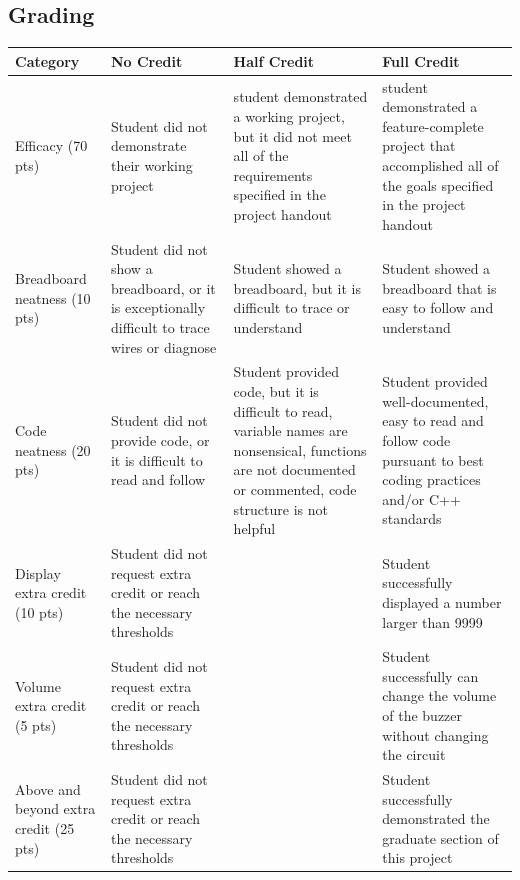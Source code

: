 \documentclass{article}
\begin{document}
    \subsection*{Grading}
    \begin{tabular}{ | p{1in} | p{1.75in} | p{1.75in} | p{1.75in} | }
        \hline
        \textbf{Category} & \textbf{No Credit} & \textbf{Half Credit} & \textbf{Full Credit} \\

        \hline
        Efficacy (70 pts) & 
        Student did not demonstrate their working project & 
        student demonstrated a working project, but it did not meet all of the requirements specified in the project handout & 
        student demonstrated a feature-complete project that accomplished all of the goals specified in the project handout \\
        \hline
        Breadboard neatness (10 pts) & 
        Student did not show a breadboard, or it is exceptionally difficult to trace wires or diagnose &
        Student showed a breadboard, but it is difficult to trace or understand &
        Student showed a breadboard that is easy to follow and understand \\
        \hline
        Code neatness (20 pts) & 
        Student did not provide code, or it is difficult to read and follow &
        Student provided code, but it is difficult to read, variable names are nonsensical, functions are not documented or commented, code structure is not helpful &
        Student provided well-documented, easy to read and follow code pursuant to best coding practices and/or C++ standards \\
        \hline
        Display extra credit (10 pts) &
        Student did not request extra credit or reach the necessary thresholds & 
        &
        Student successfully displayed a number larger than 9999 \\
        \hline
        Volume extra credit (5 pts) &
        Student did not request extra credit or reach the necessary thresholds & 
        &
        Student successfully can change the volume of the buzzer without changing the circuit \\
        \hline
        Above and beyond extra credit (25 pts) &
        Student did not request extra credit or reach the necessary thresholds & 
        &
        Student successfully demonstrated the graduate section of this project \\
        \hline
    \end{tabular}
\end{document}
